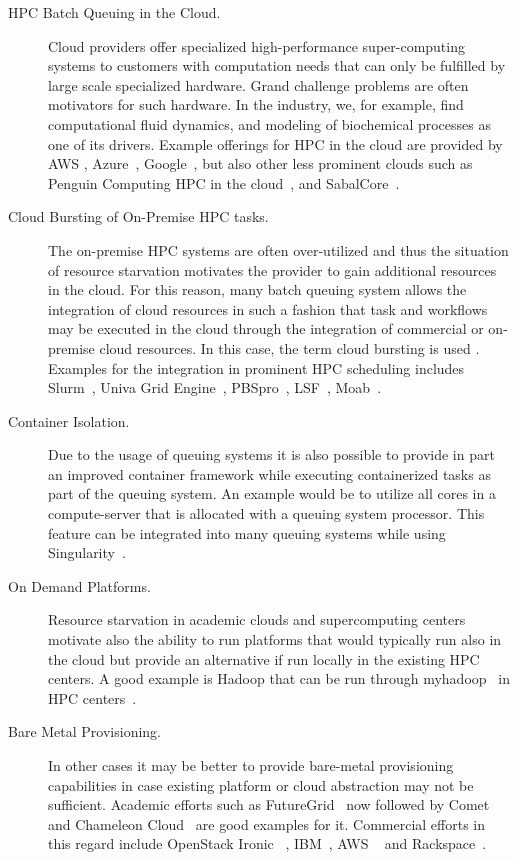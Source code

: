 \documentclass[final,5p,times,twocolumn]{elsarticle}
\begin{document}
\begin{description}

\item[HPC Batch Queuing in the Cloud.] Cloud providers offer specialized high-performance super-computing systems to customers with computation needs that can only be fulfilled by large scale specialized hardware. Grand challenge problems are often motivators for such hardware. In the industry, we, for example, find computational fluid dynamics, and modeling of biochemical processes as one of its drivers. Example offerings for HPC in the cloud are provided by AWS \cite{www-aws-hpc}, Azure~\cite{www-azure-hpc}, Google~\cite{www-google-hpc}, but also other less prominent clouds such as Penguin Computing HPC in the cloud~\cite{PODHPCCloud2019}, and SabalCore~\cite{Sabalcore2019}.
 
\item[Cloud Bursting of On-Premise HPC tasks.] The on-premise HPC systems are often over-utilized and thus the situation of resource starvation motivates the provider to gain additional resources in the cloud. For this reason, many batch queuing system allows the integration of cloud resources in such a fashion that task and workflows may be executed in the cloud through the integration of commercial or on-premise cloud resources. In this case, the term cloud bursting is used \cite{CloudBursting2019,BurstingHPC2019}. Examples for the integration in prominent HPC scheduling includes Slurm~\cite{www-slurm}, Univa Grid Engine~\cite{www-univa}, PBSpro~\cite{www-pbs-manual}, LSF~\cite{www-lsf}, Moab~\cite{www-moab}.

\item[Container Isolation.] Due to the usage of queuing systems it is also possible to provide in part an improved container framework while executing containerized tasks as part of the queuing system. An example would be to utilize all cores in a compute-server that is allocated with a queuing system processor. This feature can be integrated into many queuing systems while using Singularity~\cite{www-singularity}.

\item[On Demand Platforms.] Resource starvation in academic clouds and supercomputing centers motivate also the ability to run platforms that would typically run also in the cloud but provide an alternative if run locally in the existing HPC centers. A good example is Hadoop that can be run through myhadoop~\cite{krishnan2011myhadoop} in HPC centers~\cite{SDSC2019}.

\item[Bare Metal Provisioning.] In other cases it may be better to provide bare-metal provisioning capabilities in case existing platform or cloud abstraction may not be sufficient. Academic efforts such as FutureGrid~\cite{fox2013futuregrid} now followed by Comet~\cite{las-comet} and Chameleon Cloud~\cite{Chameleoncloud2019} are good examples for it. Commercial efforts in this regard include OpenStack Ironic ~\cite{OpenstackIronic2019}, IBM~\cite{IBMBareMetal2019}, AWS ~\cite{AWS2019} and Rackspace~\cite{Rackspace2019}.

\end{description}
\end{document}

